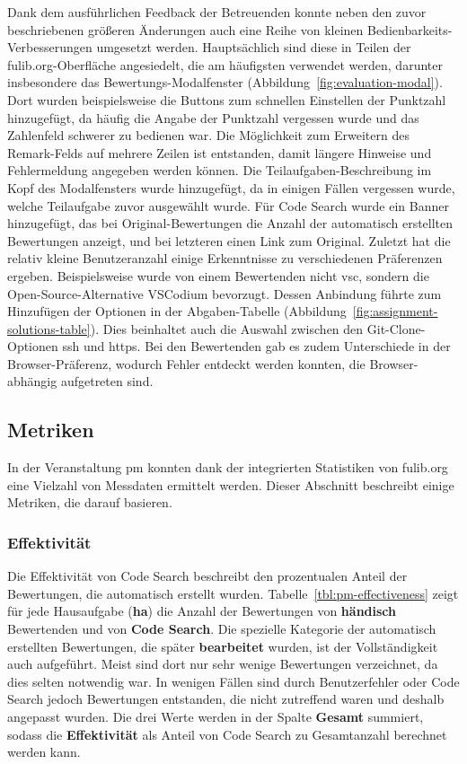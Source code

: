 Dank dem ausführlichen Feedback der Betreuenden konnte neben den zuvor beschriebenen größeren Änderungen auch eine Reihe von kleinen Bedienbarkeits-Verbesserungen umgesetzt werden.
Hauptsächlich sind diese in Teilen der fulib.org-Oberfläche angesiedelt, die am häufigsten verwendet werden, darunter insbesondere das Bewertungs-Modalfenster (Abbildung~\ref{fig:evaluation-modal}).
Dort wurden beispielsweise die Buttons zum schnellen Einstellen der Punktzahl hinzugefügt, da häufig die Angabe der Punktzahl vergessen wurde und das Zahlenfeld schwerer zu bedienen war.
Die Möglichkeit zum Erweitern des Remark-Felds auf mehrere Zeilen ist entstanden, damit längere Hinweise und Fehlermeldung angegeben werden können.
Die Teilaufgaben-Beschreibung im Kopf des Modalfensters wurde hinzugefügt, da in einigen Fällen vergessen wurde, welche Teilaufgabe zuvor ausgewählt wurde.
Für Code Search wurde ein Banner hinzugefügt, das bei Original-Bewertungen die Anzahl der automatisch erstellten Bewertungen anzeigt, und bei letzteren einen Link zum Original.
Zuletzt hat die relativ kleine Benutzeranzahl einige Erkenntnisse zu verschiedenen Präferenzen ergeben.
Beispielsweise wurde von einem Bewertenden nicht \ac{vsc}, sondern die Open-Source-Alternative VSCodium bevorzugt.
Dessen Anbindung führte zum Hinzufügen der Optionen in der Abgaben-Tabelle (Abbildung~\ref{fig:assignment-solutions-table}).
Dies beinhaltet auch die Auswahl zwischen den Git-Clone-Optionen \ac{ssh} und \ac{https}.
Bei den Bewertenden gab es zudem Unterschiede in der Browser-Präferenz, wodurch Fehler entdeckt werden konnten, die Browser-abhängig aufgetreten sind.

\subsection{Metriken}\label{subsec:pm-metrics}

In der Veranstaltung \ac{pm} konnten dank der integrierten Statistiken von fulib.org eine Vielzahl von Messdaten ermittelt werden.
Dieser Abschnitt beschreibt einige Metriken, die darauf basieren.

\subsubsection{Effektivität}

Die Effektivität von Code Search beschreibt den prozentualen Anteil der Bewertungen, die automatisch erstellt wurden.
Tabelle~\ref{tbl:pm-effectiveness} zeigt für jede Hausaufgabe (\textbf{\acs{ha}}) die Anzahl der Bewertungen von \textbf{händisch} Bewertenden und von \textbf{Code Search}.
Die spezielle Kategorie der automatisch erstellten Bewertungen, die später \textbf{bearbeitet} wurden, ist der Vollständigkeit auch aufgeführt.
Meist sind dort nur sehr wenige Bewertungen verzeichnet, da dies selten notwendig war.
In wenigen Fällen sind durch Benutzerfehler oder Code Search jedoch Bewertungen entstanden, die nicht zutreffend waren und deshalb angepasst wurden.
Die drei Werte werden in der Spalte \textbf{Gesamt} summiert, sodass die \textbf{Effektivität} als Anteil von Code Search zu Gesamtanzahl berechnet werden kann.


